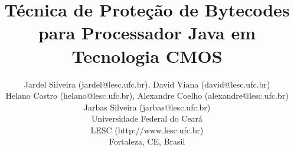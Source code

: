\documentclass[10pt,twocolumn]{article}
\begin{document}
\title{Técnica de Proteção de Bytecodes para Processador Java em Tecnologia CMOS}

\author{Jardel Silveira (jardel@lesc.ufc.br), David Viana (david@lesc.ufc.br) \\ Helano Castro (helano@lesc.ufc.br), Alexandre Coelho (alexandre@lesc.ufc.br) \\ Jarbas Silveira (jarbas@lesc.ufc.br) \\
Universidade Federal do Ceará \\ LESC (http://www.lesc.ufc.br) \\ Fortaleza, CE, Brasil  %
}

\maketitle
\thispagestyle{empty}
\end{document}
